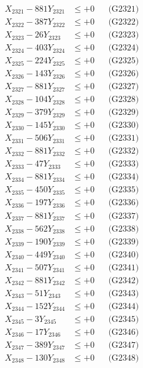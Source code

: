 \documentclass[a4paper,10pt]{article}
\begin{document}
{\begin{align}
\allowbreak
X_{2321} - 881Y_{2321} &\leq +0 && \text{(G2321)} \\
X_{2322} - 387Y_{2322} &\leq +0 && \text{(G2322)} \\
X_{2323} - 26Y_{2323} &\leq +0 && \text{(G2323)} \\
X_{2324} - 403Y_{2324} &\leq +0 && \text{(G2324)} \\
X_{2325} - 224Y_{2325} &\leq +0 && \text{(G2325)} \\
X_{2326} - 143Y_{2326} &\leq +0 && \text{(G2326)} \\
X_{2327} - 881Y_{2327} &\leq +0 && \text{(G2327)} \\
X_{2328} - 104Y_{2328} &\leq +0 && \text{(G2328)} \\
X_{2329} - 379Y_{2329} &\leq +0 && \text{(G2329)} \\
X_{2330} - 145Y_{2330} &\leq +0 && \text{(G2330)} \\
\allowbreak
X_{2331} - 506Y_{2331} &\leq +0 && \text{(G2331)} \\
X_{2332} - 881Y_{2332} &\leq +0 && \text{(G2332)} \\
X_{2333} - 47Y_{2333} &\leq +0 && \text{(G2333)} \\
X_{2334} - 881Y_{2334} &\leq +0 && \text{(G2334)} \\
X_{2335} - 450Y_{2335} &\leq +0 && \text{(G2335)} \\
X_{2336} - 197Y_{2336} &\leq +0 && \text{(G2336)} \\
X_{2337} - 881Y_{2337} &\leq +0 && \text{(G2337)} \\
X_{2338} - 562Y_{2338} &\leq +0 && \text{(G2338)} \\
X_{2339} - 190Y_{2339} &\leq +0 && \text{(G2339)} \\
X_{2340} - 449Y_{2340} &\leq +0 && \text{(G2340)} \\
\allowbreak
X_{2341} - 507Y_{2341} &\leq +0 && \text{(G2341)} \\
X_{2342} - 881Y_{2342} &\leq +0 && \text{(G2342)} \\
X_{2343} - 51Y_{2343} &\leq +0 && \text{(G2343)} \\
X_{2344} - 152Y_{2344} &\leq +0 && \text{(G2344)} \\
X_{2345} - 3Y_{2345} &\leq +0 && \text{(G2345)} \\
X_{2346} - 17Y_{2346} &\leq +0 && \text{(G2346)} \\
X_{2347} - 389Y_{2347} &\leq +0 && \text{(G2347)} \\
X_{2348} - 130Y_{2348} &\leq +0 && \text{(G2348)} \\

\end{align}}
\end{document}
